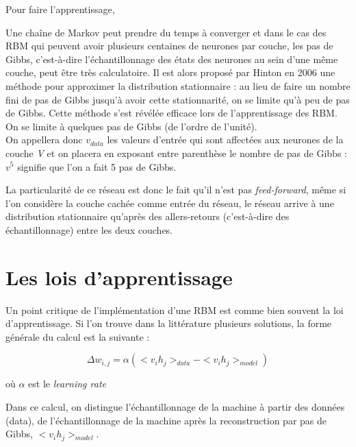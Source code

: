 \documentclass[a4paper,oneside]{report}
\begin{document}
Pour faire l'apprentissage,

Une chaîne de Markov peut prendre du temps à converger et dans le cas des RBM qui peuvent 
avoir plusieurs centaines de neurones par couche, les pas de Gibbs, c'est-à-dire l'échantillonnage
 des états des neurones au sein d'une même couche, peut être très calculatoire. Il est alors proposé par 
Hinton en 2006 une méthode pour approximer la distribution stationnaire : au lieu de faire un nombre
 fini de pas de Gibbs jusqu'à avoir cette stationnarité, on se limite qu'à peu de pas de Gibbs. Cette 
méthode s'est révélée efficace lors de l'apprentissage des RBM. On se limite à quelques pas de Gibbs (de l'ordre de l'unité).\\

On appellera donc \textit{$v_{data}$} les valeurs d'entrée qui sont affectées aux neurones de la couche \textit{V} et on placera en exposant entre parenthèse
le nombre de pas de Gibbs :  \textit{$v^{5}$} signifie que l'on a fait 5 pas de Gibbs.

                La particularité de ce réseau est donc le fait qu'il n'est pas
                \textit{feed-forward}, même si l'on considère la couche cachée comme entrée du
                réseau, le réseau arrive à une distribution stationnaire qu'après des allers-retours (c'est-à-dire des échantillonnage) entre
les deux couches.


            \section{Les lois d'apprentissage}

                Un point critique de l'implémentation d'une RBM est comme bien souvent la loi 
d'apprentissage.
                Si l'on trouve dans la littérature plusieurs solutions, la forme générale du calcul 
est la suivante :

                \begin{equation}
                    \Delta w_{i,j} = \alpha (<v_{i}h_{j}>_{data} - <v_{i}h_{j}>_{model} )
                \end{equation}
                
                où \begin{math}\alpha\end{math} est le \textit{learning rate}

                Dans ce calcul, on distingue l'échantillonnage de la machine à partir des données 
(data), de l'échantillonnage de la machine après la reconstruction par pas de Gibbs, 
\begin{math}<v_{i}h_{j}>_{model}\end{math}.\\
                
\end{document}
